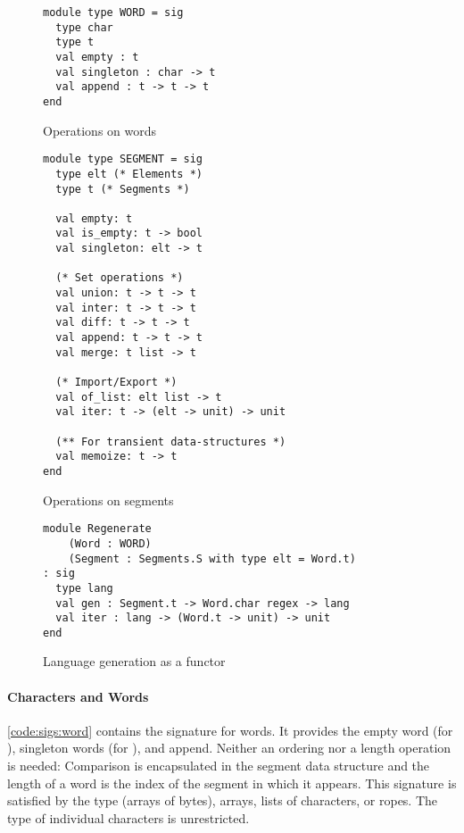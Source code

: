 \begin{figure}[tp]
\begin{lstlisting}
module type WORD = sig
  type char
  type t
  val empty : t
  val singleton : char -> t
  val append : t -> t -> t
end
\end{lstlisting}
\vspace{-\baselineskip}
    \caption{Operations on words}
    \label{code:sigs:word}

\begin{lstlisting}
module type SEGMENT = sig
  type elt (* Elements *)
  type t (* Segments *)

  val empty: t
  val is_empty: t -> bool
  val singleton: elt -> t

  (* Set operations *)
  val union: t -> t -> t
  val inter: t -> t -> t
  val diff: t -> t -> t
  val append: t -> t -> t
  val merge: t list -> t

  (* Import/Export *)
  val of_list: elt list -> t
  val iter: t -> (elt -> unit) -> unit

  (** For transient data-structures *)
  val memoize: t -> t
end
\end{lstlisting}
\vspace{-\baselineskip}
    \caption{Operations on segments}
    \label{code:sigs:segment}
    
\begin{lstlisting}
module Regenerate
    (Word : WORD)
    (Segment : Segments.S with type elt = Word.t)
: sig
  type lang
  val gen : Segment.t -> Word.char regex -> lang
  val iter : lang -> (Word.t -> unit) -> unit
end
\end{lstlisting}
\vspace{-\baselineskip}
    \caption{Language generation as a functor}
    \label{code:sigs:regen}
\end{figure}

\paragraph{Characters and Words}

\autoref{code:sigs:word} contains the signature for words.
It provides
the empty word (for ),
singleton words (for ), and append.
Neither an ordering nor a length operation is needed:
Comparison is encapsulated in the segment
data structure and the length of a word is the index of the segment in
which it appears.
%
This signature is satisfied by the \ocaml {}
type (\ie arrays of bytes), arrays, lists of characters, or ropes. The
type of individual characters is unrestricted.

